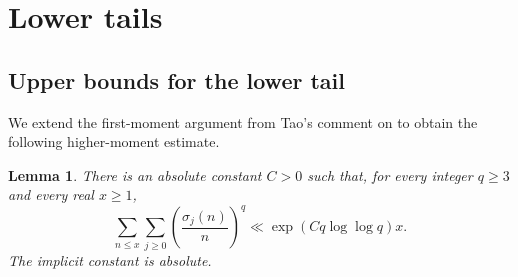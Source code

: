 \documentclass[11pt,letterpaper,reqno]{amsart}
\numberwithin{equation}{section}
\newtheorem{lemma}[theorem]{Lemma}
\theoremstyle{remark}
\renewcommand{\leq}{\leqslant}
\renewcommand{\geq}{\geqslant}
\begin{document}

\section{Lower tails}

\subsection{Upper bounds for the lower tail}

We extend the first-moment argument from Tao's comment on \cite{Bloom1054} to obtain the following higher-moment estimate.

\begin{lemma}\label{lem:kovac-moment}
There is an absolute constant $C>0$ such that, for every integer $q\geq3$
and every real $x\geq1$,
\[
 \sum_{n\leq x}\sum_{j\geq0}
 \left(\frac{\sigma_j(n)}n\right)^q
 \ll \exp(Cq\log\log q)x.
\]
The implicit constant is absolute.
\end{lemma}
\end{document}
